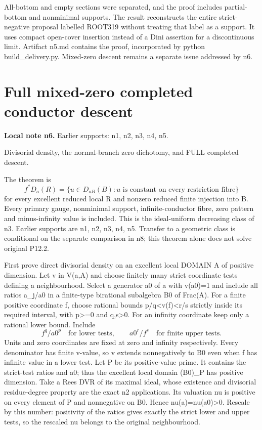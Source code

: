 \documentclass[11pt]{article}
\begin{document}
All-bottom and empty sections were separated, and the proof includes partial-bottom and nonminimal supports. The result reconstructs the entire strict-negative proposal labelled ROOT319 without treating that label as a support. It uses compact open-cover insertion instead of a Dini assertion for a discontinuous limit. Artifact n5.md contains the proof, incorporated by python build\_delivery.py. Mixed-zero descent remains a separate issue addressed by n6.


\section{Full mixed-zero completed conductor descent}
\label{sec:n6}
\noindent\textbf{Local note n6.} Earlier supports: n1, n2, n3, n4, n5.

Divisorial density, the normal-branch zero dichotomy, and FULL completed descent.

The theorem is
\[
 f^*D_a(R)=\{u\in D_{aB}(B):u\text{ is constant on every restriction fibre}\}
\]
for every excellent reduced local R and nonzero reduced finite injection into B. Every primary gauge, nonminimal support, infinite-conductor fibre, zero pattern and minus-infinity value is included. This is the ideal-uniform decreasing class of n3. Earlier supports are n1, n2, n3, n4, n5. Transfer to a geometric class is conditional on the separate comparison in n8; this theorem alone does not solve original P12.2.

First prove direct divisorial density on an excellent local DOMAIN A of positive dimension. Let v in V(a,A) and choose finitely many strict coordinate tests defining a neighbourhood. Select a generator a0 of a with v(a0)=1 and include all ratios a\_j/a0 in a finite-type birational subalgebra B0 of Frac(A). For a finite positive coordinate f, choose rational bounds p/q<v(f)<r/s strictly inside its required interval, with p>=0 and q,s>0. For an infinity coordinate keep only a rational lower bound. Include
\[
 f^q/a0^p\quad\text{for lower tests},\qquad
 a0^r/f^s\quad\text{for finite upper tests}.
\]
Units and zero coordinates are fixed at zero and infinity respectively. Every denominator has finite v-value, so v extends nonnegatively to B0 even when f has infinite value in a lower test. Let P be its positive-value prime. It contains the strict-test ratios and a0; thus the excellent local domain (B0)\_P has positive dimension. Take a Rees DVR of its maximal ideal, whose existence and divisorial residue-degree property are the exact n2 applications. Its valuation nu is positive on every element of P and nonnegative on B0. Hence nu(a)=nu(a0)>0. Rescale by this number: positivity of the ratios gives exactly the strict lower and upper tests, so the rescaled nu belongs to the original neighbourhood.
\end{document}
